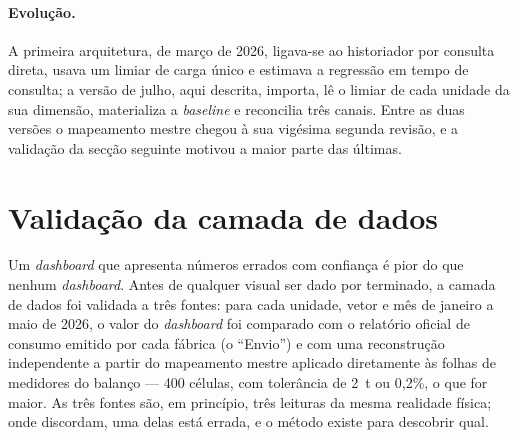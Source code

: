 \paragraph{Evolução.} A primeira arquitetura, de março de 2026, ligava-se
ao historiador por consulta direta, usava um limiar de carga único e
estimava a regressão em tempo de consulta; a versão de julho, aqui
descrita, importa, lê o limiar de cada unidade da sua dimensão,
materializa a \emph{baseline} e reconcilia três canais. Entre as duas
versões o mapeamento mestre chegou à sua vigésima segunda revisão, e a
validação da secção seguinte motivou a maior parte das últimas.

\section{Validação da camada de dados}
\label{sec:validacao-dados}

Um \emph{dashboard} que apresenta números errados com confiança é pior do
que nenhum \emph{dashboard}. Antes de qualquer visual ser dado por
terminado, a camada de dados foi validada a três fontes: para cada
unidade, vetor e mês de janeiro a maio de 2026, o valor do
\emph{dashboard} foi comparado com o relatório oficial de consumo emitido
por cada fábrica (o ``Envio'') e com uma reconstrução independente a
partir do mapeamento mestre aplicado diretamente às folhas de medidores do
balanço --- 400 células, com tolerância de 2~t ou 0,2\%, o que for maior.
As três fontes são, em princípio, três leituras da mesma realidade física;
onde discordam, uma delas está errada, e o método existe para descobrir
qual.

